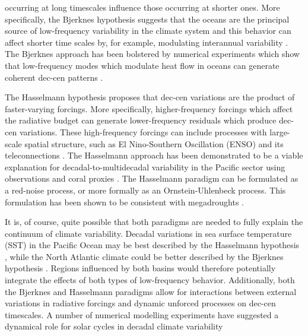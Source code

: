 \documentclass[phd,tocprelim]{cornell}
\begin{document}
occurring at long timescales influence those occurring at shorter 
ones. More specifically, the Bjerknes hypothesis suggests that the oceans 
are the principal source of low-frequency variability in the climate 
system and this behavior can affect shorter time scales by, for 
example, modulating interannual variability 
\cite{gershunov1998interdecadal,power1999decadal,oglesby2012role}. 
The Bjerknes approach has been bolstered by numerical experiments which
show that low-frequency modes which modulate heat flow in oceans can 
generate coherent dec-cen patterns
\cite{latif2006review,meehl2011model,delworth2012multicentennial}.
\par
The Hasselmann hypothesis proposes that dec-cen variations are the 
product of faster-varying forcings. More specifically, higher-frequency 
forcings \cite{hasselmann1976stochastic,newman2003enso} which affect 
the radiative budget \cite{schurer2013separating,ault2013continuum} 
can generate lower-frequency residuals which produce dec-cen variations.
These high-frequency forcings can include processes with large-scale 
spatial structure, such as El Nino-Southern Oscillation (ENSO) and 
its teleconnections 
\cite{vimont2005contribution,ault2009intensified,wittenberg2009historical,ault2013continuum}.  
The Hasselmann approach has been demonstrated to be a viable explanation 
for decadal-to-multidecadal variability in the Pacific sector using 
observations \cite{newman2003enso,shakun2009tropical} and coral proxies 
\cite{ault2009intensified,ault2013continuum}. The Hasselmann paradigm can 
be formulated as a red-noise process, or more formally as an Ornstein-Uhlenbeck 
process. This formulation has been shown to be consistent with megadroughts 
\cite{ault2018mega}.
\par
It is, of course, quite possible that both paradigms are needed 
to fully explain the continuum of climate variability. 
Decadal variations in sea surface temperature (SST) in the 
Pacific Ocean may be best described by the Hasselmann hypothesis 
\cite{newman2003enso}, while the North Atlantic climate could be 
better described by the Bjerknes hypothesis \cite{delworth2000observed}. 
Regions influenced by both basins would therefore potentially 
integrate the effects of both types of low-frequency behavior.
Additionally, both the Bjerknes and Hasselmann paradigms allow 
for interactions between external variations in radiative 
forcings and dynamic unforced processes on dec-cen timescales. 
A number of numerical modelling experiments have suggested a 
dynamical role for solar cycles in decadal climate variability 
\end{document}
